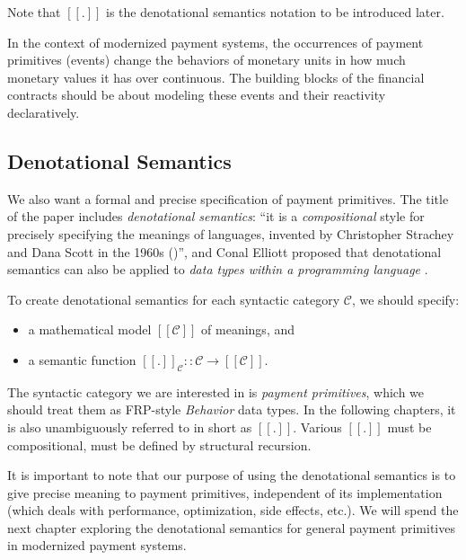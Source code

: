 Note that $[\![.]\!]$ is the denotational semantics notation to be introduced later.

In the context of modernized payment systems, the occurrences of payment primitives (events) change the behaviors of
monetary units in how much monetary values it has over continuous. The building blocks of the financial contracts should
be about modeling these events and their reactivity declaratively.

\subsection{Denotational Semantics}

We also want a formal and precise specification of payment primitives. The title of the paper includes
\textit{denotational semantics}: ``it is a \textit{compositional} style for precisely specifying the meanings of
languages, invented by Christopher Strachey and Dana Scott in the 1960s (\cite{scott1971toward})'', and Conal Elliott
proposed that denotational semantics can also be applied to \textit{data types within a programming language}
.

To create denotational semantics for each syntactic category $\mathcal{C}$, we should specify:

\begin{itemize}
\item a mathematical model $[\![\mathcal{C}]\!]$ of meanings, and
\item a semantic function $[\![.]\!]_{\mathcal{C}} :: \mathcal{C} \rightarrow [\![\mathcal{C}]\!]$.
\end{itemize}

The syntactic category we are interested in is \textit{payment primitives}, which we should treat them as FRP-style
\textit{Behavior} data types. In the following chapters, it is also unambiguously referred to in short as
$[\![.]\!]$. Various $[\![.]\!]$ must be compositional, \ie must be defined by structural recursion.

It is important to note that our purpose of using the denotational semantics is to give precise meaning to payment
primitives, independent of its implementation (which deals with performance, optimization, side effects, etc.). We will
spend the next chapter exploring the denotational semantics for general payment primitives in modernized payment
systems.


